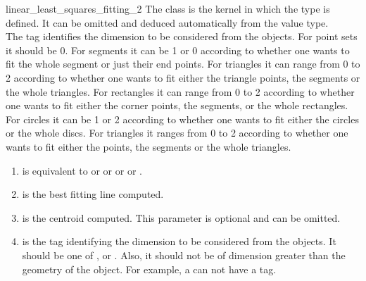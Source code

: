 \begin{ccRefFunction}{linear_least_squares_fitting_2}
The class  is the kernel in which the type  is defined. It can be omitted and deduced automatically from the value type.\\

The tag  identifies the dimension to be considered from the objects. For point sets it should be 0. For segments it can be 1 or 0 according to whether one wants to fit the whole segment or just their end points. For triangles it can range from 0 to 2 according to whether one wants to fit either the triangle points, the segments or the whole triangles. For rectangles it can range from 0 to 2 according to whether one wants to fit either the corner points, the segments, or the whole rectangles. For circles it can be 1 or 2 according to whether one wants to fit either the circles or the whole discs. For triangles it ranges from 0 to 2 according to whether one wants to fit either the points, the segments or the whole triangles.



\begin{enumerate}
   \item  {} is equivalent to  or 
           or  or  or
          .
   \item  {} is the best fitting line computed.
   \item  {} is the centroid computed. This parameter is optional and can be
          omitted.
   \item  {} is the tag identifying the dimension to be considered from the objects. It should be one of ,  or . Also, it should not be of dimension greater than the geometry of the object. For example, a  can not have a  tag.
\end{enumerate}

\end{ccRefFunction}
